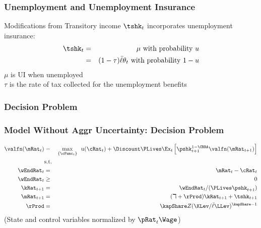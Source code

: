 \documentclass{beamer}
\newcommand{\jemph}[1]{{\color{jirkasred}#1}}
\renewcommand{\ptyLev}{\ensuremath{Z}} %
\begin{document}
\begin{frame}
\frametitle{Unemployment and Unemployment Insurance}

\begin{block}{Modifications from \citet{carroll:brookings}}
Transitory income $\tshk_{t}$ incorporates \jemph{unemployment insurance}:
\begin{eqnarray*}
\tshk_{t} &=&\mu \text{ with probability $u$} \\
&=&(1-\tau)\bar{\ell}\theta_{t}\text{ with probability $1-u$}
\end{eqnarray*}
$\mu$ is UI when unemployed\\
 $\tau$ is the rate of tax collected for the unemployment benefits
\end{block}

\end{frame}


\subsubsection{Decision Problem}
\begin{frame}
\frametitle{{Model Without Aggr Uncertainty: Decision Problem}}

\providecommand{\uFunc}{\mathrm{u}}

\begin{eqnarray*}
\valfn(\mRat_{t})&=& \underset{\{\cFunc_{t}\}}{\max } ~~
\uFunc(\cRat_{t})
+\Discount \PLives \Ex_{t}\left[ \pshk_{t+1}^{1-\CRRA}\valfn(\mRat_{t+1})
\right]   \label{eq:hetdecisionprobnashk}\\
\notag &\text{s.t.}&\\
\notag \wEndRat_{t} &=&\mRat_{t}-\cRat_{t} \\
\notag \wEndRat_{t} &\geq &0 \\
\kRat_{t+1} &=&\wEndRat_{t}/(\PLives \pshk_{t+1})  \label{indconst3}
\\
\mRat_{t+1} &=&(\daleth +\rProd)\kRat_{t+1}+\tshk_{t+1} \label{indconst4} \\
\notag \rProd &=&\kapShare\ptyLev(\KLev/\bar{\ell}\LLev)^{\kapShare-1}
\end{eqnarray*}
(State and control variables normalized by $\pRat_{t} \Wage$)

\end{frame}


\end{document}
